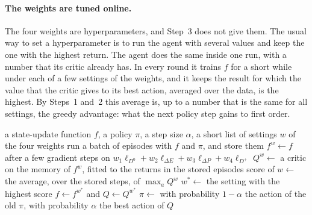 \documentclass[11pt]{article}
\theoremstyle{definition}
\newcommand{\dE}{\Delta E}
\newcommand{\dP}{\Delta P}
\begin{document}
\paragraph{The weights are tuned online.} The four weights are hyperparameters, and Step~3 does not give them. The usual way to set a hyperparameter is to run the agent with several values and keep the one with the highest return. The agent does the same inside one run, with a number that its critic already has. In every round it trains $f$ for a short while under each of a few settings of the weights, and it keeps the result for which the value that the critic gives to its best action, averaged over the data, is the highest. By Steps~1 and~2 this average is, up to a number that is the same for all settings, the greedy advantage: what the next policy step gains to first order.

\begin{algorithm}[h]
\caption{Recurrent actor-critic with four auxiliary losses whose weights are tuned online}\label{alg:round}
\begin{algorithmic}[1]
\Require a state-update function $f$, a policy $\pi$, a step size $\alpha$, a short list of settings $w$ of the four weights
\Loop {}
  \State run a batch of episodes with $f$ and $\pi$, and store them
    \State $f^w\gets f$ after a few gradient steps on $w_1\ell_{D^0}+w_2\ell_{\dE}+w_3\ell_{\dP}+w_4\ell_{D^+}$
    \State $Q^w\gets$ a critic on the memory of $f^w$, fitted to the returns in the stored episodes
    \State score of $w\gets$ the average, over the stored steps, of $\max_aQ^w$
  \EndFor
  \State $w^*\gets$ the setting with the highest score
  \State $f\gets f^{w^*}$ and $Q\gets Q^{w^*}$
  \State $\pi\gets$ with probability $1-\alpha$ the action of the old $\pi$, with probability $\alpha$ the best action of $Q$
\EndLoop
\end{algorithmic}
\end{algorithm}
\end{document}
